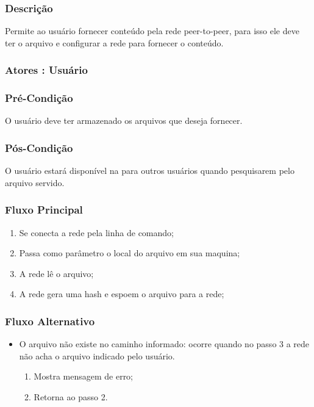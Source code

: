 \subsubsection{Descrição}

Permite ao usuário fornecer conteúdo pela rede peer-to-peer, para isso ele deve ter o arquivo e configurar a rede para fornecer o conteúdo.

\subsubsection{Atores : Usuário}

\subsubsection{Pré-Condição}

O usuário deve ter armazenado os arquivos que deseja fornecer.

\subsubsection{Pós-Condição}

O usuário estará disponível na para outros usuários quando pesquisarem pelo arquivo servido. 

\subsubsection{Fluxo Principal}

\begin{enumerate}
    \item Se conecta a rede pela linha de comando;
    \item Passa como parâmetro o local do arquivo em sua maquina;
    \item A rede lê o arquivo;
    \item A rede gera uma hash e espoem o arquivo para a rede;
\end{enumerate}

\subsubsection{Fluxo Alternativo}

\begin{itemize}
    \item O arquivo não existe no caminho informado: ocorre quando no passo 3 a rede não acha o arquivo indicado pelo usuário.
    \begin{enumerate}
        \item Mostra mensagem de erro;
        \item Retorna ao passo 2.
    \end{enumerate}
\end{itemize}


